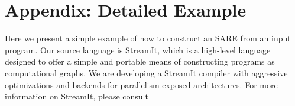 \section{Appendix: Detailed Example}
Here we present a simple example of how to construct an SARE from an
input program.  Our source language is StreamIt, which is a high-level
language designed to offer a simple and portable means of constructing
programs as computational graphs.  We are developing a StreamIt
compiler with aggressive optimizations and backends for
parallelism-exposed architectures.  For more information on StreamIt,
please consult~\cite{streamitcc,Gordo02}




